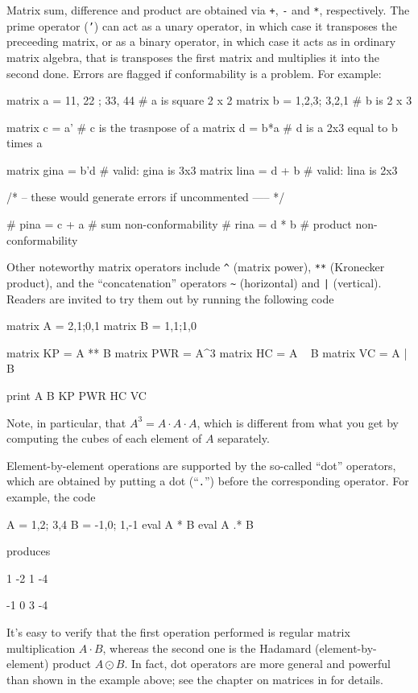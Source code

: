 Matrix sum, difference and product are obtained via \texttt{+},
\texttt{-} and \texttt{*}, respectively. The prime operator
(\texttt{'}) can act as a unary operator, in which case it transposes
the preceeding matrix, or as a binary operator, in which case it acts
as in ordinary matrix algebra, that is transposes the first matrix and
multiplies it into the second done. Errors are flagged if
conformability is a problem. For example:
\begin{code}
  matrix a = {11, 22 ; 33, 44}  # a is square 2 x 2
  matrix b = {1,2,3; 3,2,1}     # b is 2 x 3

  matrix c = a'         # c is the trasnpose of a
  matrix d = b*a        # d is a 2x3 equal to b times a

  matrix gina = b'd     # valid: gina is 3x3
  matrix lina = d + b   # valid: lina is 2x3

  /* -- these would generate errors if uncommented ----- */

  # pina = c + a  # sum non-conformability
  # rina = d * b  # product non-conformability
\end{code}

Other noteworthy matrix operators include \texttt{\^} (matrix power),
\texttt{**} (Kronecker product), and the ``concatenation'' operators
\verb|~| (horizontal) and \texttt{|} (vertical). Readers are invited
to try them out by running the following code
\begin{code}
matrix A = {2,1;0,1}
matrix B = {1,1;1,0}

matrix KP = A ** B
matrix PWR = A^3 
matrix HC = A ~ B
matrix VC = A | B

print A B KP PWR HC VC
\end{code}
Note, in particular, that $A^3 = A \cdot A \cdot A$, which is different
from what you get by computing the cubes of each element of $A$
separately.

Element-by-element operations are supported by the so-called ``dot''
operators, which are obtained by putting a dot (``\texttt{.}'') before
the corresponding operator. For example, the code
\begin{code}
A = {1,2; 3,4}
B = {-1,0; 1,-1}
eval A * B
eval A .* B
\end{code}
produces
\begin{code}
   1   -2 
   1   -4 

  -1    0 
   3   -4 
\end{code}

It's easy to verify that the first operation performed is regular
matrix multiplication $A \cdot B$, whereas the second one is the
Hadamard (element-by-element) product $A \odot B$. In fact, dot
operators are more general and powerful than shown in the example
above; see the chapter on matrices in \GUG{} for details.


